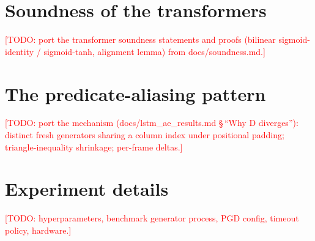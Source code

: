 \documentclass{article} %
\newcommand{\todo}[1]{\textcolor{red}{[TODO: #1]}}
\begin{document}



\appendix
\section{Soundness of the transformers}
\todo{port the transformer soundness statements and proofs
(bilinear sigmoid-identity / sigmoid-tanh, alignment lemma) from
docs/soundness.md.}

\section{The predicate-aliasing pattern}
\todo{port the mechanism (docs/lstm\_ae\_results.md \S\,``Why D
diverges''): distinct fresh generators sharing a column index under
positional padding; triangle-inequality shrinkage; per-frame deltas.}

\section{Experiment details}
\todo{hyperparameters, benchmark generator process, PGD config,
timeout policy, hardware.}
\end{document}
